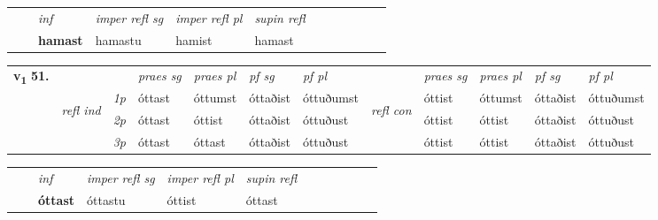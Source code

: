 \begin{tabular}{llllllllllll}
 & & \textit{inf}   & \textit{imper refl sg} & \textit{imper refl pl}   & \textit{supin refl}      \\*
  & & \textbf{hamast}    & hamastu & hamist   & hamast  \\*
\cmidrule{1-12}
\end{tabular}



\begin{tabular}{llllllllllll} \toprule
\multirow{4}{*}{{{\textbf{v{\textsubscript{1}}} \Large{\textbf{51.}}}}}  & &   &  \textit{praes sg}  & \textit{praes pl}  &\textit{pf sg} & \textit{pf pl} &  &  \textit{praes sg}  & \textit{praes pl}  & \textit{pf sg} & \textit{pf pl } \\*
	\cmidrule{4-7} \cmidrule{9-12}
 &\multirow{3}{*}{\begin{turn}{90}\textit{refl ind}\end{turn}} & {\textit{1p}} & óttast & óttumst    & óttaðist & óttuðumst & \multirow{3}{*}{\begin{turn}{90}\textit{refl con}\end{turn}}  &óttist & óttumst & óttaðist & óttuðumst\\*
 &&  {\textit{2p}} &  óttast  & óttist   & óttaðist & óttuðust & &óttist & óttist & óttaðist & óttuðust \\*
& &  {\textit{3p}} & óttast & óttast   & óttaðist & óttuðust & & óttist & óttist& óttaðist & óttuðust  \\*
\cmidrule{4-7} \cmidrule{9-12}
\end{tabular}


\begin{tabular}{llllllllllll}
 & & \textit{inf}   & \textit{imper refl sg} & \textit{imper refl pl}   & \textit{supin refl}      \\*
  & & \textbf{óttast}    & óttastu & óttist   & óttast  \\*
\cmidrule{1-12}
\end{tabular}



